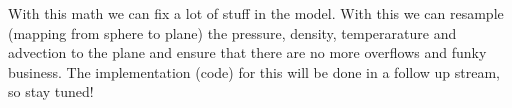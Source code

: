 With this math we can fix a lot of stuff in the model. With this we can resample (mapping from sphere to plane) the pressure, density, temperarature and advection to the plane and ensure that 
there are no more overflows and funky business. The implementation (code) for this will be done in a follow up stream, so stay tuned!